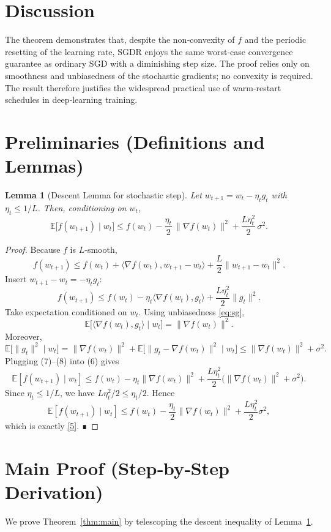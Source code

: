 \documentclass{article}
\newtheorem{lemma}{Lemma}
\begin{document}
\section*{Discussion}
The theorem demonstrates that, despite the non‑convexity of $f$ and the periodic resetting of the learning rate, SGDR enjoys the same worst‑case convergence guarantee as ordinary SGD with a diminishing step size. The proof relies only on smoothness and unbiasedness of the stochastic gradients; no convexity is required. The result therefore justifies the widespread practical use of warm‑restart schedules in deep‑learning training.

\newpage

\section*{Preliminaries (Definitions and Lemmas)}
\begin{lemma}[Descent Lemma for stochastic step]\label{lem:descent}
Let $w_{t+1}=w_t-\eta_t g_t$ with $\eta_t\le 1/L$. Then, conditioning on $w_t$,
\[
\mathbb{E}\!\big[ f(w_{t+1})\mid w_t\big]
\le f(w_t)-\frac{\eta_t}{2}\,\big\|\nabla f(w_t)\big\|^2
+\frac{L\eta_t^2}{2}\,\sigma^2 .
\tag{5}
\]
\end{lemma}
\begin{proof}
Because $f$ is $L$‑smooth,
\[
f(w_{t+1})\le f(w_t)+\langle\nabla f(w_t),w_{t+1}-w_t\rangle
+\frac{L}{2}\|w_{t+1}-w_t\|^2 .
\]
Insert $w_{t+1}-w_t=-\eta_t g_t$:
\[
f(w_{t+1})\le f(w_t)-\eta_t\langle\nabla f(w_t),g_t\rangle
+\frac{L\eta_t^2}{2}\|g_t\|^2 .
\tag{6}
\]
Take expectation conditioned on $w_t$. Using unbiasedness \eqref{eq:sg},
\[
\mathbb{E}\big[\langle\nabla f(w_t),g_t\rangle\mid w_t\big]
= \|\nabla f(w_t)\|^2 .
\tag{7}
\]
Moreover,
\[
\mathbb{E}\big[\|g_t\|^2\mid w_t\big]
= \|\nabla f(w_t)\|^2+\mathbb{E}\big[\|g_t-\nabla f(w_t)\|^2\mid w_t\big]
\le \|\nabla f(w_t)\|^2+\sigma^2 .
\tag{8}
\]
Plugging (7)–(8) into (6) gives
\[
\mathbb{E}[f(w_{t+1})\mid w_t]
\le f(w_t)-\eta_t\|\nabla f(w_t)\|^2
+\frac{L\eta_t^2}{2}\big(\|\nabla f(w_t)\|^2+\sigma^2\big).
\]
Since $\eta_t\le 1/L$, we have $L\eta_t^2/2\le \eta_t/2$. Hence
\[
\mathbb{E}[f(w_{t+1})\mid w_t]
\le f(w_t)-\frac{\eta_t}{2}\|\nabla f(w_t)\|^2
+\frac{L\eta_t^2}{2}\sigma^2,
\]
which is exactly \eqref{5}. ∎
\end{proof}

\section*{Main Proof (Step‑by‑Step Derivation)}
We prove Theorem~\ref{thm:main} by telescoping the descent inequality of Lemma~\ref{lem:descent}.
\end{document}
